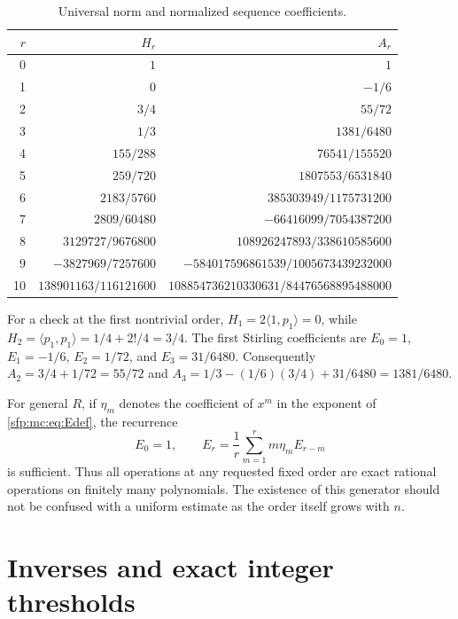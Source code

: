 \documentclass[11pt,letterpaper]{article}
\numberwithin{equation}{section}
\theoremstyle{definition}\newtheorem{definition}[theorem]{Definition}
\theoremstyle{remark}\newtheorem{remark}[theorem]{Remark}
\begin{document}
\begin{table}[htbp]
\centering
\caption{Universal norm and normalized sequence coefficients.}
\label{sfp:mc:tab:coeff}
\renewcommand{\arraystretch}{1.17}
\begin{tabular}{r@{\qquad}r@{\qquad}r}
\toprule
$r$ & $H_r$ & $A_r$\\
\midrule
0 & $1$ & $1$\\
1 & $0$ & $-1/6$\\
2 & $3/4$ & $55/72$\\
3 & $1/3$ & $1381/6480$\\
4 & $155/288$ & $76541/155520$\\
5 & $259/720$ & $1807553/6531840$\\
6 & $2183/5760$ & $385303949/1175731200$\\
7 & $2809/60480$ & $-66416099/7054387200$\\
8 & $3129727/9676800$ & $108926247893/338610585600$\\
9 & $-3827969/7257600$ & $-584017596861539/1005673439232000$\\
10 & $138901163/116121600$ & $108854736210330631/84476568895488000$\\
\bottomrule
\end{tabular}
\end{table}

For a check at the first nontrivial order,
$H_1=2\langle1,p_1\rangle=0$, while
$H_2=\langle p_1,p_1\rangle=1/4+2!/4=3/4$.
The first Stirling coefficients are
$E_0=1$, $E_1=-1/6$, $E_2=1/72$, and $E_3=31/6480$.
Consequently $A_2=3/4+1/72=55/72$ and
$A_3=1/3-(1/6)(3/4)+31/6480=1381/6480$.

For general $R$, if $\eta_m$ denotes the coefficient of $x^m$
in the exponent of \eqref{sfp:mc:eq:Edef}, the recurrence
\begin{equation}\label{sfp:mc:eq:Erec}
 E_0=1,\qquad E_r=\frac1r\sum_{m=1}^{r}m\eta_m E_{r-m}
\end{equation}
is sufficient. Thus all operations at any requested fixed order
are exact rational operations on finitely many polynomials.
The existence of this generator should not be confused with a
uniform estimate as the order itself grows with $n$.

\section{Inverses and exact integer thresholds}\label{sfp:mc:sec:inverse}
\end{document}
